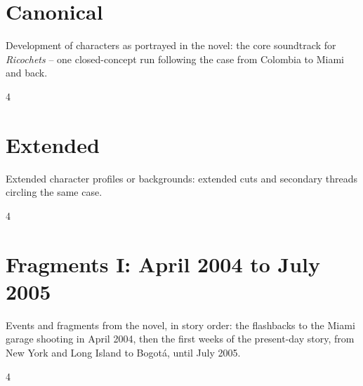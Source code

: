 \documentclass[a4paper,landscape]{memoir}
\begin{document}
\chapter{Canonical}
Development of characters as portrayed in the novel: the core soundtrack for \emph{Ricochets} -- one closed-concept run following the case from Colombia to Miami and back.
\clearpage\begin{multicols*}{4}




















\end{multicols*}

\chapter{Extended}
Extended character profiles or backgrounds: extended cuts and secondary threads circling the same case.
\clearpage\begin{multicols*}{4}










\end{multicols*}

\chapter{Fragments I: April 2004 to July 2005}
Events and fragments from the novel, in story order: the flashbacks to the Miami garage shooting in April 2004, then the first weeks of the present-day story, from New York and Long Island to Bogotá, until July 2005.
\clearpage\begin{multicols*}{4}










\end{multicols*}
\end{document}
